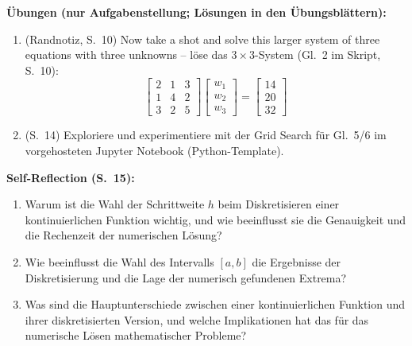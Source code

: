 \textbf{Übungen (nur Aufgabenstellung; Lösungen in den Übungsblättern):}
\begin{enumerate}[itemsep=1pt]
  \item (Randnotiz, S.~10) \glqq Now take a shot and solve this larger system of three equations with three unknowns\grqq{} -- löse das $3\times 3$-System (Gl.~2 im Skript, S.~10):
  \[
  \begin{bmatrix} 2 & 1 & 3 \\ 1 & 4 & 2 \\ 3 & 2 & 5 \end{bmatrix}
  \begin{bmatrix} w_1 \\ w_2 \\ w_3 \end{bmatrix}
  =
  \begin{bmatrix} 14 \\ 20 \\ 32 \end{bmatrix}
  \]
  \item (S.~14) Exploriere und experimentiere mit der Grid Search für Gl.~5/6 im vorgehosteten Jupyter Notebook (Python-Template).
\end{enumerate}

\textbf{Self-Reflection (S.~15):}
\begin{enumerate}[itemsep=1pt]
  \item Warum ist die Wahl der Schrittweite $h$ beim Diskretisieren einer kontinuierlichen Funktion wichtig, und wie beeinflusst sie die Genauigkeit und die Rechenzeit der numerischen Lösung?
  \item Wie beeinflusst die Wahl des Intervalls $[a,b]$ die Ergebnisse der Diskretisierung und die Lage der numerisch gefundenen Extrema?
  \item Was sind die Hauptunterschiede zwischen einer kontinuierlichen Funktion und ihrer diskretisierten Version, und welche Implikationen hat das für das numerische Lösen mathematischer Probleme?
\end{enumerate}

